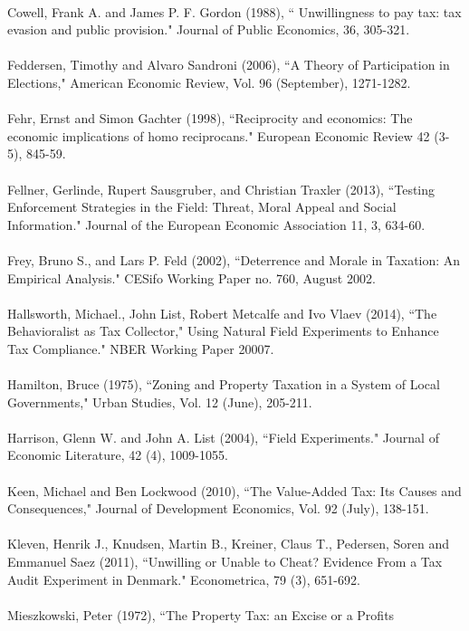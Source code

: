 \documentclass[12pt,titlepage]{article}
\begin{document}
\\ 
Cowell, Frank A. and James P. F. Gordon (1988), `` Unwillingness to
pay tax: tax evasion and public provision."  Journal of Public
Economics, 36, 305-321.\\ 
\\ 
Feddersen, Timothy and Alvaro Sandroni (2006), ``A Theory of
Participation in Elections," American Economic Review, Vol. 96
(September), 1271-1282.  \\ 
\\ 
Fehr, Ernst and Simon Gachter (1998), ``Reciprocity and economics: The
economic implications of homo reciprocans." European Economic Review
42 (3-5), 845-59. \\ 
\\ 
Fellner, Gerlinde, Rupert Sausgruber, and Christian Traxler (2013),
``Testing Enforcement Strategies in the Field: Threat, Moral Appeal
and Social Information." Journal of the European Economic Association
11, 3, 634-60.\\ 
\\ 
Frey, Bruno S., and Lars P. Feld (2002), ``Deterrence and Morale in
Taxation: An Empirical Analysis."  CESifo Working Paper no. 760,
August 2002. \\ 
\\ 
Hallsworth, Michael., John List, Robert Metcalfe and Ivo Vlaev (2014),
``The Behavioralist as Tax Collector," Using Natural Field Experiments
to Enhance Tax Compliance." NBER Working Paper 20007. \\ 
\\ 
Hamilton, Bruce (1975), ``Zoning and Property Taxation in a System of
Local Governments," Urban Studies, Vol. 12 (June),
205-211. \\ 
\\ 
Harrison, Glenn W. and John A. List (2004), ``Field Experiments."
Journal of Economic Literature, 42 (4), 1009-1055.\\ 
\\ 
Keen, Michael and Ben Lockwood (2010), ``The Value-Added Tax: Its
Causes and Consequences," Journal of Development Economics, Vol. 92
(July), 138-151. \\ 
\\ 
Kleven, Henrik J., Knudsen, Martin B., Kreiner, Claus T., Pedersen,
Soren and Emmanuel Saez (2011), ``Unwilling or Unable to Cheat?
Evidence From a Tax Audit Experiment in Denmark."  Econometrica, 79
(3), 651-692. \\ 
\\ 
Mieszkowski, Peter (1972), ``The Property Tax: an Excise or a Profits
\end{document}
